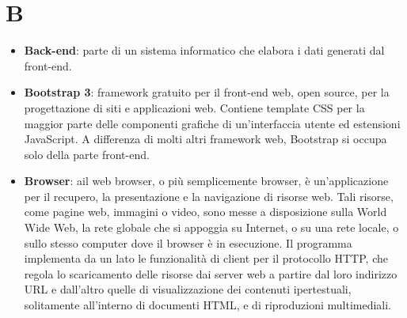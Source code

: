 \newpage
\section{B}

\begin{itemize}
	\item \textbf{Back-end}: parte di un sistema informatico che elabora i dati generati dal front-end.
	\item \textbf{Bootstrap 3}: framework gratuito per il front-end web, open source, per la progettazione di siti e applicazioni web. Contiene template CSS per la maggior parte delle componenti grafiche di un'interfaccia utente ed estensioni JavaScript. A differenza di molti altri framework web, Bootstrap si occupa solo della parte front-end.
	\item \textbf{Browser}: ail web browser, o più semplicemente browser, è un'applicazione per il recupero, la presentazione e la navigazione di risorse web. Tali risorse, come pagine web, immagini o video, sono messe a disposizione sulla World Wide Web, la rete globale che si appoggia su Internet, o su una rete locale, o sullo stesso computer dove il browser è in esecuzione. Il programma implementa da un lato le funzionalità di client per il protocollo HTTP, che regola lo scaricamento delle risorse dai server web a partire dal loro indirizzo URL e dall'altro quelle di visualizzazione dei contenuti ipertestuali, solitamente all'interno di documenti HTML, e di riproduzioni multimediali.
\end{itemize}
